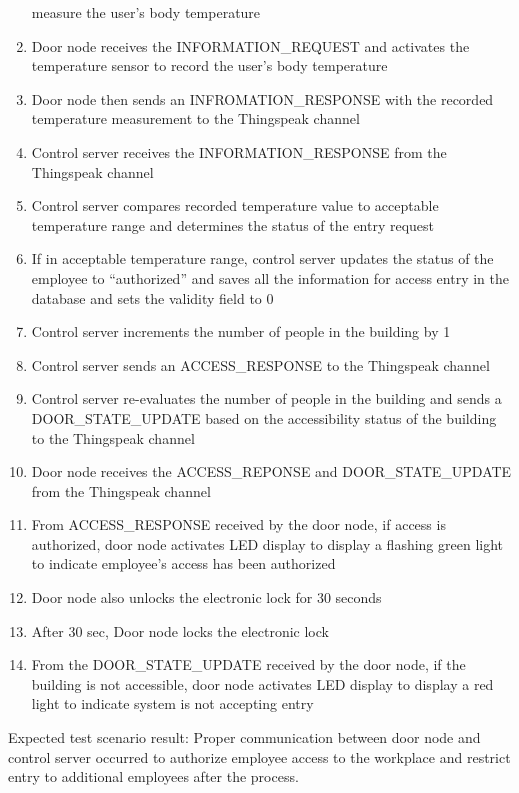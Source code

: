 \begin{enumerate}
          measure the user’s body temperature
    \item Door node receives the INFORMATION\_REQUEST and activates the
          temperature sensor to record the user’s body temperature 
    \item Door node then sends an INFROMATION\_RESPONSE with the recorded
          temperature measurement to the Thingspeak channel 
    \item Control server receives the INFORMATION\_RESPONSE from the Thingspeak
          channel
    \item Control server compares recorded temperature value to acceptable
          temperature range and determines the status of the entry request
    \item If in acceptable temperature range, control server updates the status
          of the employee to “authorized” and saves all the information for
          access entry in the database and sets the validity field to 0
    \item Control server increments the number of people in the building by 1
    \item Control server sends an ACCESS\_RESPONSE to the Thingspeak channel
    \item Control server re-evaluates the number of people in the building and
          sends a DOOR\_STATE\_UPDATE based on the accessibility status of the
          building to the Thingspeak channel
    \item Door node receives the ACCESS\_REPONSE and DOOR\_STATE\_UPDATE from
          the Thingspeak channel
    \item From ACCESS\_RESPONSE received by the door node, if access is
          authorized, door node activates LED display to display a flashing
          green light to indicate employee’s access has been authorized 
    \item Door node also unlocks the electronic lock for 30 seconds
    \item After 30 sec, Door node locks the electronic lock
    \item From the DOOR\_STATE\_UPDATE received by the door node, if the
          building is not accessible, door node activates LED display to display
          a red light to indicate system is not accepting entry
\end{enumerate}

\noindent
Expected test scenario result: Proper communication between door node and
control server occurred to authorize employee access to the workplace and
restrict entry to additional employees after the process.

